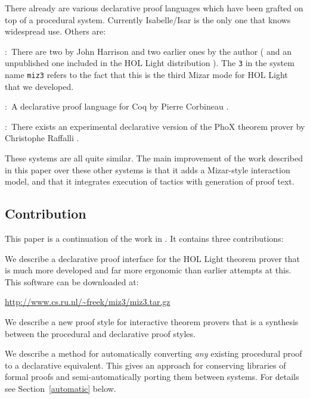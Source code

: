 \documentclass{LMCS}
\let\xmedskip=\medskip
\begin{document}
\noindent
There already are various declarative proof languages which have been grafted
on top of a procedural system.
Currently Isabelle/Isar
is the only one that knows widespread use.
Others are:
\begin{desCription}
\item{}:\
There are two by John Harrison \cite{har:96,har:07:1} and two earlier ones by the author (\cite{wie:01} and an unpublished
one included in the HOL Light distribution \cite{har:xx}).
The \texttt{3} in the system name \texttt{miz3} refers to the fact that this is the third Mizar mode for HOL Light that we developed.
\medskip

\item{}:\ 
A declarative proof language for Coq by Pierre Corbineau \cite{cor:07}.
\medskip

\item{}:\
There exists an experimental declarative version of the PhoX theorem prover by Christophe Raffalli \cite{pho:xx}.

\end{desCription}

\noindent
These systems are all quite similar.
The main improvement of the work described in this paper over these
other systems is that it adds a Mizar-style interaction model,
and that it integrates execution of tactics with generation of proof text.

\subsection{Contribution}

\noindent
This paper is a continuation of the work in \cite{kal:wie:09,wie:01}.
It contains three contributions:
\begin{iteMize}{}
\item
We describe a declarative proof interface for the HOL Light
theorem prover that is much more developed and far more ergonomic
than earlier attempts at this.
This software can be downloaded at:
\xmedskip
\begin{center}
\url{http://www.cs.ru.nl/~freek/miz3/miz3.tar.gz}
\end{center}
\xmedskip

\item
We describe a new proof style for interactive theorem provers
that is a synthesis between the
procedural and declarative proof styles.

\item
We describe a method for automatically converting \emph{any}
existing procedural proof to a declarative equivalent.
This gives an approach for conserving
libraries of formal proofs and semi-automatically porting them between
systems.
For details see Section~\ref{automatic} below.

\end{iteMize}
\end{document}
